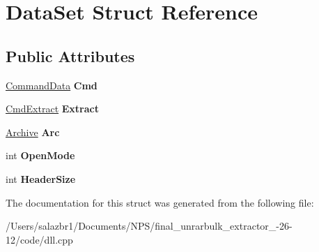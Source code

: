 \hypertarget{struct_data_set}{\section{Data\-Set Struct Reference}
\label{struct_data_set}
}
\subsection*{Public Attributes}
\begin{DoxyCompactItemize}
\item 
\hypertarget{struct_data_set_afa8cc4d545dd6096f7bc1c405940df33}{\hyperlink{class_command_data}{Command\-Data} {\bfseries Cmd}}\label{struct_data_set_afa8cc4d545dd6096f7bc1c405940df33}

\item 
\hypertarget{struct_data_set_aa44e543420917338ddf434a0f031302f}{\hyperlink{class_cmd_extract}{Cmd\-Extract} {\bfseries Extract}}\label{struct_data_set_aa44e543420917338ddf434a0f031302f}

\item 
\hypertarget{struct_data_set_a9d63ec4ab19d8657b441a46c40712345}{\hyperlink{class_archive}{Archive} {\bfseries Arc}}\label{struct_data_set_a9d63ec4ab19d8657b441a46c40712345}

\item 
\hypertarget{struct_data_set_a899cc829146adf2907aff0fba4dfd435}{int {\bfseries Open\-Mode}}\label{struct_data_set_a899cc829146adf2907aff0fba4dfd435}

\item 
\hypertarget{struct_data_set_afff4c9b6ad3d80f1caf5a5db7cb2c05f}{int {\bfseries Header\-Size}}\label{struct_data_set_afff4c9b6ad3d80f1caf5a5db7cb2c05f}

\end{DoxyCompactItemize}


The documentation for this struct was generated from the following file\-:\begin{DoxyCompactItemize}
\item 
/\-Users/salazbr1/\-Documents/\-N\-P\-S/final\-\_\-unrarbulk\-\_\-extractor\-\_-\/26-\/12/code/dll.\-cpp\end{DoxyCompactItemize}
